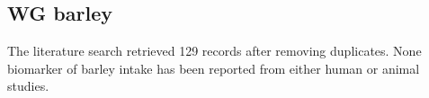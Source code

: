 \subsection{WG barley}
The literature search retrieved 129 records after removing duplicates. None biomarker of barley intake has been reported from either human or animal studies.




